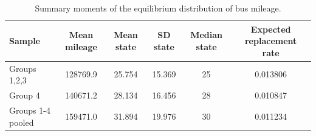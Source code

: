 \begin{table}[htbp]
\centering
\caption{Summary moments of the equilibrium distribution of bus mileage.}
\label{tab:rust\_equilibrium\_distribution\_summary}
\begin{tabular}{lccccc}
\toprule
Sample & Mean mileage & Mean state & SD state & Median state & Expected replacement rate \\
\midrule
Groups 1,2,3 & 128769.9 & 25.754 & 15.369 & 25 & 0.013806 \\
Group 4 & 140671.2 & 28.134 & 16.456 & 28 & 0.010847 \\
Groups 1-4 pooled & 159471.0 & 31.894 & 19.976 & 30 & 0.011234 \\
\bottomrule
\end{tabular}
\end{table}